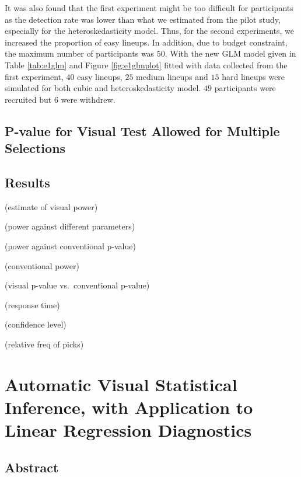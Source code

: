 \documentclass{monashthesis}
\theoremstyle{definition}
\theoremstyle{definition}
\theoremstyle{definition}
\theoremstyle{definition}
\theoremstyle{remark}
\begin{document}
It was also found that the first experiment might be too difficult for participants as the detection rate was lower than what we estimated from the pilot study, especially for the heteroskedasticity model. Thus, for the second experiments, we increased the proportion of easy lineups. In addition, due to budget constraint, the maximum number of participants was \(50\). With the new GLM model given in Table \ref{tab:e1glm} and Figure \ref{fig:e1glmplot} fitted with data collected from the first experiment, \(40\) easy lineups, \(25\) medium lineups and \(15\) hard lineups were simulated for both cubic and heteroskedasticity model. \(49\) participants were recruited but \(6\) were withdrew.

\hypertarget{p-value-for-visual-test-allowed-for-multiple-selections}{%
\section{P-value for Visual Test Allowed for Multiple Selections}\label{p-value-for-visual-test-allowed-for-multiple-selections}}

\hypertarget{results}{%
\section{Results}\label{results}}

(estimate of visual power)

(power against different parameters)

(power against conventional p-value)

(conventional power)

(visual p-value vs.~conventional p-value)

(response time)

(confidence level)

(relative freq of picks)

\clearpage

\hypertarget{ch:paper1}{%
\chapter{Automatic Visual Statistical Inference, with Application to Linear Regression Diagnostics}\label{ch:paper1}}

\hypertarget{abstract-1}{%
\section{Abstract}\label{abstract-1}}
\end{document}
